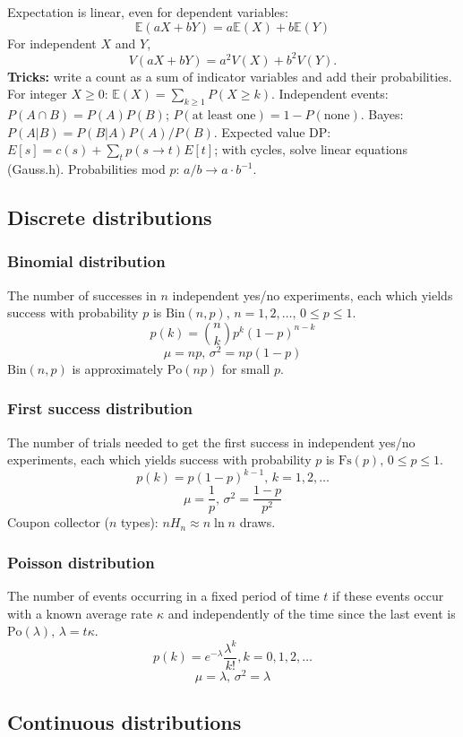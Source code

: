 Expectation is linear, even for dependent variables:
\[\mathbb{E}(aX+bY) = a\mathbb{E}(X)+b\mathbb{E}(Y)\]
For independent $X$ and $Y$, \[V(aX+bY) = a^2V(X)+b^2V(Y).\]
\textbf{Tricks:} write a count as a sum of indicator variables and add their probabilities.
For integer $X\ge0$: $\mathbb{E}(X)=\sum_{k\ge1}P(X\ge k)$. Independent events: $P(A\cap B)=P(A)P(B)$;
$P(\text{at least one}) = 1 - P(\text{none})$. Bayes: $P(A|B)=P(B|A)P(A)/P(B)$.
Expected value DP: $E[s] = c(s) + \sum_t p(s\to t)E[t]$; with cycles, solve linear equations (Gauss.h).
Probabilities mod $p$: $a/b \to a\cdot b^{-1}$.

\subsection{Discrete distributions}

\subsubsection{Binomial distribution}
The number of successes in $n$ independent yes/no experiments, each which yields success with probability $p$ is $\textrm{Bin}(n,p),\,n=1,2,\dots,\, 0\leq p\leq1$.
\[p(k)=\binom{n}{k}p^k(1-p)^{n-k}\]
\[\mu = np,\,\sigma^2=np(1-p)\]
$\textrm{Bin}(n,p)$ is approximately $\textrm{Po}(np)$ for small $p$.

\subsubsection{First success distribution}
The number of trials needed to get the first success in independent yes/no experiments, each which yields success with probability $p$ is $\textrm{Fs}(p),\,0\leq p\leq1$.
\[p(k)=p(1-p)^{k-1},\,k=1,2,\dots\]
\[\mu = \frac1p,\,\sigma^2=\frac{1-p}{p^2}\]
Coupon collector ($n$ types): $n H_n \approx n\ln n$ draws.

\subsubsection{Poisson distribution}
The number of events occurring in a fixed period of time $t$ if these events occur with a known average rate $\kappa$ and independently of the time since the last event is $\textrm{Po}(\lambda),\,\lambda=t\kappa$.
\[p(k)=e^{-\lambda}\frac{\lambda^k}{k!}, k=0,1,2,\dots\]
\[\mu=\lambda,\,\sigma^2=\lambda\]

\subsection{Continuous distributions}

